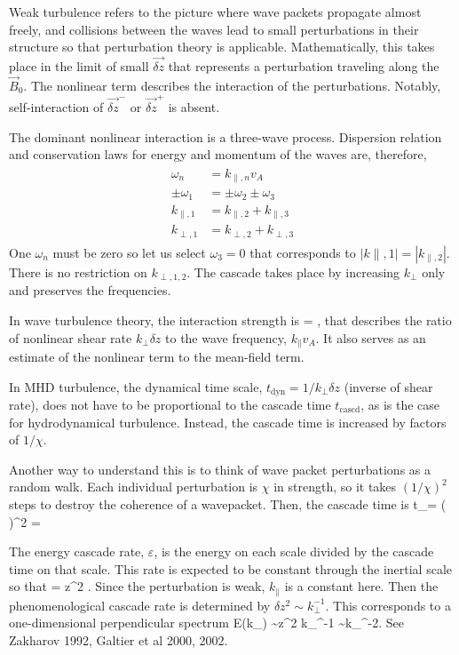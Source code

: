 \documentclass[usenatbib,twocolumn]{aastex63}
\newcommand{\tcascd}{t_\mathrm{cascd}} %
\begin{document}
Weak turbulence refers to the picture where wave packets propagate almost freely, and collisions between the waves lead to small perturbations in their structure so that perturbation theory is applicable.
Mathematically, this takes place in the limit of small $\vec{\delta z}$ that represents a perturbation traveling along the $\vec{B}_0$.
The nonlinear term describes the interaction of the perturbations.
Notably, self-interaction of $\vec{\delta z}^-$ or $\vec{\delta z}^+$ is absent.

The dominant nonlinear interaction is a three-wave process.
Dispersion relation and conservation laws for energy and momentum of the waves are, therefore,
\begin{align}\begin{split}
    \omega_n &= k_{\parallel,n} v_A \\
    \pm \omega_1 &= \pm \omega_2 \pm \omega_3 \\
    k_{\parallel,1} &= k_{\parallel,2} + k_{\parallel,3} \\
    k_{\perp,1} &= k_{\perp,2} + k_{\perp,3} 
\end{split}\end{align}
One $\omega_n$ must be zero so let us select $\omega_3=0$ that corresponds to $|k{\parallel,1}| = |k_{\parallel,2}|$.
There is no restriction on $k_{\perp,1,2}$.
The cascade takes place by increasing $k_\perp$ only and preserves the frequencies.

In wave turbulence theory, the interaction strength is
\be
\chi = ,
\ee
that describes the ratio of nonlinear shear rate $k_\perp \delta z$ to the wave frequency, $k_\parallel v_A$.
It also serves as an estimate of the nonlinear term to the mean-field term.

In MHD turbulence, the dynamical time scale, $t_\mathrm{dyn} = 1/k_\perp \delta z$ (inverse of shear rate), does not have to be proportional to the cascade time $\tcascd$, as is the case for hydrodynamical turbulence.
Instead, the cascade time is increased by factors of $1/\chi$.

Another way to understand this is to think of wave packet perturbations as a random walk.
Each individual perturbation is $\chi$ in strength, so it takes $(1/\chi)^2$ steps to destroy the coherence of a wavepacket.
Then, the cascade time is
\be
\tcascd =  \left(  \right)^2 = 
\ee

The energy cascade rate, $\varepsilon$, is the energy on each scale divided by the cascade time on that scale.
This rate is expected to be constant through the inertial scale so that
\be
\epsilon = \delta z^2 .
\ee
Since the perturbation is weak, $k_\parallel$ is a constant here.
Then the phenomenological cascade rate is determined by $\delta z^2 \sim k_\perp^{-1}$.
This corresponds to a one-dimensional perpendicular spectrum
\be
E(k_\perp) \sim \delta z^2 k_\perp^{-1} \sim k_\perp^{-2}.
\ee
See Zakharov 1992, Galtier et al 2000, 2002.
\end{document}
